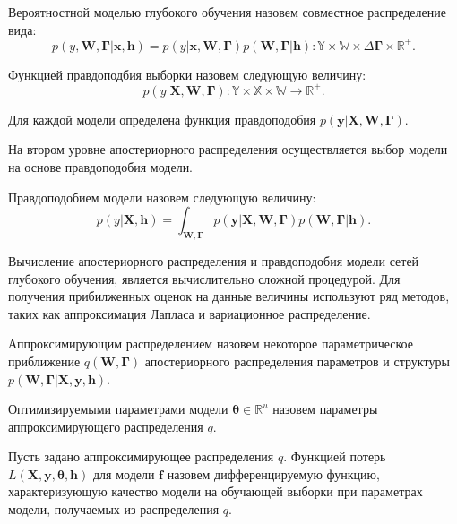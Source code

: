 \begin{defin}
Вероятностной моделью глубокого обучения назовем совместное распределение вида:
\[
    p({y}, \mathbf{W},  \boldsymbol{\Gamma}|\mathbf{x}, \mathbf{h}) = p({y}|\mathbf{x}, \mathbf{W},  \boldsymbol{\Gamma})p( \mathbf{W},  \boldsymbol{\Gamma}|\mathbf{h}): \mathbb{Y} \times \mathbb{W}  \times \Delta{\boldsymbol{\Gamma}} \times \mathbb{R}^{+}.
\]
\end{defin}

\begin{defin}
Функцией правдоподбия выборки назовем следующую величину:
\[
    p(y|\mathbf{X}, \mathbf{W}, \boldsymbol{\Gamma}): \mathbb{Y} \times \mathbb{X} \times \mathbb{W} \to \mathbb{R}^{+}.
\]
\end{defin}
Для каждой модели определена функция правдоподобия  $p(\mathbf{y}|\mathbf{X}, \mathbf{W}, \boldsymbol{\Gamma})$.
 
На втором уровне апостериорного распределения осуществляется выбор модели на основе правдоподобия модели.
\begin{defin}
Правдоподобием модели назовем следующую величину:
\begin{equation}
\label{eq:evidence}
p(y|\mathbf{X}, \mathbf{h}) = \int_{\mathbf{W}, \boldsymbol{\Gamma}} p(\mathbf{y}|\mathbf{X}, \mathbf{W}, \boldsymbol{\Gamma})p(\mathbf{W}, \boldsymbol{\Gamma}|\mathbf{h}).
\end{equation}
\end{defin}
Вычисление апостериорного распределения и правдоподобия модели сетей глубокого обучения, является вычислительно сложной процедурой. Для получения прибилженных оценок на данные величины используют ряд методов, таких как аппроксимация Лапласа и вариационное распределение. 

\begin{defin}
Аппроксимирующим распределением назовем некоторое параметрическое приближение $q(\mathbf{W}, \boldsymbol{\Gamma})$ апостериорного распределения параметров и структуры $p(\mathbf{W}, \boldsymbol{\Gamma}|\mathbf{X}, \mathbf{y}, \mathbf{h}).$ 
\end{defin}

\begin{defin}
Оптимизируемыми параметрами модели $\boldsymbol{\theta} \in \mathbb{R}^u$ назовем параметры аппроксимирующего распределения $q$.
\end{defin}

\begin{defin}
Пусть задано аппроксимирующее распределения $q$.
Функцией потерь $L(\mathbf{X}, \mathbf{y}, \boldsymbol{\theta}, \mathbf{h})$ для модели $\mathbf{f}$ назовем дифференцируемую функцию, характеризующую качество модели на обучающей выборки при параметрах модели, получаемых из  распределения $q$.
\end{defin}

